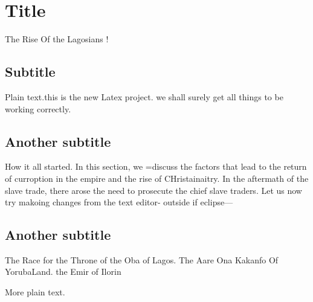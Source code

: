 \documentclass{article}
\begin{document}
\section{Title}The Rise Of the Lagosians !

\subsection{Subtitle}

Plain text.this is the new Latex project. we shall surely get all things to be
working correctly.

\subsection{Another subtitle}How it all started. In this section, we =discuss
the factors that lead to the return of curroption in the empire and the rise of
CHristainaitry. In the aftermath of the slave trade, there arose the need to
prosecute the chief slave traders.
Let us now try makoing changes from the text editor- outside if eclipse---

\subsection{Another subtitle}The Race for the Throne of the Oba of Lagos. The
Aare Ona Kakanfo Of YorubaLand. the Emir of Ilorin

More plain text.
\end{document}
